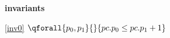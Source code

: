 \textbf{invariants}
\begin{block}
\item[ \eqref{inv0} ]$\qforall{p_0,p_1}{}{pc.p_0 \le pc.p_1 + 1} $ %
\end{block}
